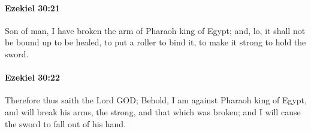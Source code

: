 		\paragraph{Ezekiel 30:21} %
			\label{EZEKIEL-30-21}

			Son of man, I have broken the arm of Pharaoh king of Egypt; and, lo, it shall not be bound up to be healed, to put a roller to bind it, to make it strong to hold the sword.


		\paragraph{Ezekiel 30:22} %
			\label{EZEKIEL-30-22}

			Therefore thus saith the Lord GOD; Behold, I am against Pharaoh king of Egypt, and will break his arms, the strong, and that which was broken; and I will cause the sword to fall out of his hand.

